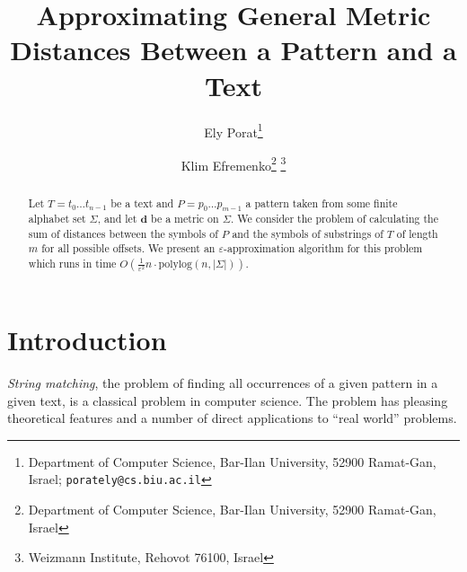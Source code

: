\documentclass[11pt]{article}
\newcommand{\envert}[1]{\left\lvert#1\right\rvert}
\let\abs=\envert
\newcommand{\dist}{\textbf{d}}
\begin{document}
\title{Approximating General Metric Distances Between a Pattern and a Text}






\author{
Ely Porat\thanks{Department of Computer Science, Bar-Ilan
University, 52900 Ramat-Gan, Israel; {\tt porately@cs.biu.ac.il}}
\and Klim Efremenko\thanks{Department of Computer Science, Bar-Ilan
University, 52900 Ramat-Gan, Israel } \thanks{ Weizmann Institute,
Rehovot 76100, Israel}}





\maketitle


\begin{abstract}
Let $T=t_0 \ldots t_{n-1}$ be a text and $P = p_0 \ldots p_{m-1}$
a pattern taken from some finite alphabet set $\Sigma$, and let
$\dist$ be a metric on $\Sigma$. We consider the problem of
calculating the sum of distances between the symbols of $P$ and
the symbols of substrings of $T$ of length $m$ for all possible
offsets. We present an $\varepsilon$-approximation algorithm for
this problem which runs in time $O(\frac{1}{\varepsilon^2}n\cdot
\mathrm{ polylog}(n,\abs{\Sigma}))$.










\end{abstract}


\setlength{\parindent}{0.0in} \setlength{\parskip}{0.1 in}
\section{Introduction \label{sec:intro}}
\emph{String matching}, the problem of finding all occurrences of a given
pattern in a given text, is a classical problem in computer
science. The problem has pleasing theoretical features and a
number of direct applications to ``real world'' problems.
\end{document}
